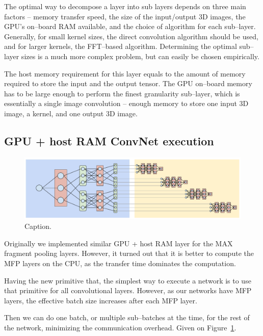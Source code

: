 \documentclass[conference]{IEEEtran}
\begin{document}
  The optimal way to decompose a layer into sub layers depends on
  three main factors -- memory transfer speed, the size of the
  input/output 3D images, the GPU's on--board RAM available, and the
  choice of algorithm for each sub--layer.  Generally, for small
  kernel sizes, the direct convolution algorithm should be used, and
  for larger kernels, the FFT--based algorithm.  Determining the
  optimal sub--layer sizes is a much more complex problem, but can
  easily be chosen empirically.

  The host memory requirement for this layer equals to the amount of
  memory required to store the input and the output tensor.  The GPU
  on--board memory has to be large enough to perform the finest
  granularity sub--layer, which is essentially a single image
  convolution -- enough memory to store one input 3D image, a kernel,
  and one output 3D image.

\subsection{GPU + host RAM ConvNet execution}


  \begin{figure}
    \begin{center}
      \includegraphics[width=0.99\columnwidth]{fig/layer_vs_batch.pdf}
    \end{center}
    \caption{Caption.}
    \label{fig:layer-vs-batch}
  \end{figure}

  Originally we implemented similar GPU + host RAM layer for the MAX
  fragment pooling layers.  However, it turned out that it is better
  to compute the MFP layers on the CPU, as the transfer time dominates
  the computation.

  Having the new primitive that, the simplest way to execute a network
  is to use that primitive for all convolutional layers.  However, as
  our networks have MFP layers, the effective batch size increases
  after each MFP layer.

  Then we can do one batch, or multiple sub--batches at the time, for
  the rest of the network, minimizing the communication overhead.
  Given on Figure~\ref{fig:layer-vs-batch}.
\end{document}

